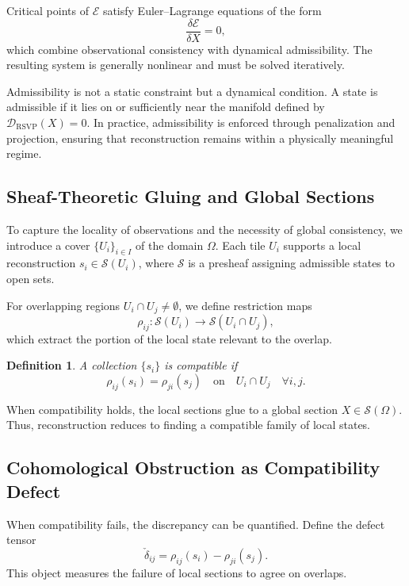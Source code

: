\documentclass[12pt, oneside]{article}
\newtheorem{definition}{Definition}
\begin{document}
Critical points of $\mathcal{E}$ satisfy Euler--Lagrange equations of the form
\[
\frac{\delta \mathcal{E}}{\delta X} = 0,
\]
which combine observational consistency with dynamical admissibility. The resulting system is generally nonlinear and must be solved iteratively.

Admissibility is not a static constraint but a dynamical condition. A state is admissible if it lies on or sufficiently near the manifold defined by $\mathcal{D}_{\text{RSVP}}(X) = 0$. In practice, admissibility is enforced through penalization and projection, ensuring that reconstruction remains within a physically meaningful regime.

\subsection{Sheaf-Theoretic Gluing and Global Sections}

To capture the locality of observations and the necessity of global consistency, we introduce a cover $\{U_i\}_{i \in I}$ of the domain $\Omega$. Each tile $U_i$ supports a local reconstruction $s_i \in \mathcal{S}(U_i)$, where $\mathcal{S}$ is a presheaf assigning admissible states to open sets.

For overlapping regions $U_i \cap U_j \neq \emptyset$, we define restriction maps
\[
\rho_{ij} : \mathcal{S}(U_i) \to \mathcal{S}(U_i \cap U_j),
\]
which extract the portion of the local state relevant to the overlap.

\begin{definition}
A collection $\{s_i\}$ is \emph{compatible} if
\[
\rho_{ij}(s_i) = \rho_{ji}(s_j) \quad \text{on} \quad U_i \cap U_j \quad \forall i,j.
\]
\end{definition}

When compatibility holds, the local sections glue to a global section $X \in \mathcal{S}(\Omega)$. Thus, reconstruction reduces to finding a compatible family of local states.



\subsection{Cohomological Obstruction as Compatibility Defect}

When compatibility fails, the discrepancy can be quantified. Define the defect tensor
\[
\check{\delta}_{ij} = \rho_{ij}(s_i) - \rho_{ji}(s_j).
\]
This object measures the failure of local sections to agree on overlaps.
\end{document}
